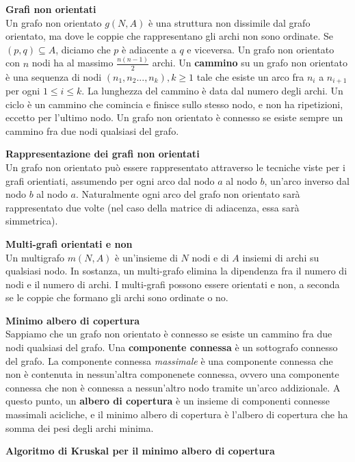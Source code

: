 \documentclass[a4paper,12pt]{article}
\begin{document}
\par\smallskip
\textbf{Grafi non orientati} \\
Un grafo non orientato $g(N, A)$ è una struttura non dissimile dal grafo orientato, ma dove le coppie che rappresentano gli archi non sono ordinate.
Se $(p,q) \subseteq A$, diciamo che $p$ è adiacente a $q$ e viceversa. Un grafo non orientato con $n$ nodi ha al massimo $\frac{n(n-1)}{2}$ archi.
Un \textbf{cammino} su un grafo non orientato è una sequenza di nodi $(n_1,n_2...,n_k), k\geq 1$ tale che esiste un arco fra $n_i$ a $n_{i+1}$ per ogni
$1 \leq i \leq k$. La lunghezza del cammino è data dal numero degli archi. Un ciclo è un cammino che comincia e finisce sullo stesso nodo, e non ha ripetizioni,
eccetto per l'ultimo nodo. Un grafo non orientato è connesso se esiste sempre un cammino fra due nodi qualsiasi del grafo.
\par\smallskip
\textbf{Rappresentazione dei grafi non orientati} \\
Un grafo non orientato può essere rappresentato attraverso le tecniche viste per i grafi orientiati, assumendo per ogni arco dal nodo $a$ al nodo $b$,
un'arco inverso dal nodo $b$ al nodo $a$. Naturalmente ogni arco del grafo non orientato sarà rappresentato due volte (nel caso della matrice di adiacenza,
essa sarà simmetrica).
\par\smallskip
\textbf{Multi-grafi orientati e non} \\
Un multigrafo $m(N, A)$ è un'insieme di $N$ nodi e di $A$ insiemi di archi su qualsiasi nodo. In sostanza, un multi-grafo elimina
la dipendenza fra il numero di nodi e il numero di archi. I multi-grafi possono essere orientati e non, a seconda se le coppie che formano
gli archi sono ordinate o no.
\par\smallskip
\textbf{Minimo albero di copertura} \\
Sappiamo che un grafo non orientato è connesso se esiste un cammino fra due nodi qualsiasi del grafo. Una \textbf{componente connessa} è un sottografo
connesso del grafo. La componente connessa \textit{massimale} è una componente connessa che non è contenuta in nessun'altra componenete connessa,
ovvero una componente connessa che non è connessa a nessun'altro nodo tramite un'arco addizionale. A questo punto, un \textbf{albero di copertura} è un insieme
di componenti connesse massimali acicliche, e il minimo albero di copertura è l'albero di copertura che ha somma dei pesi degli archi minima.
\par\smallskip
\textbf{Algoritmo di Kruskal per il minimo albero di copertura} \\
\end{document}
